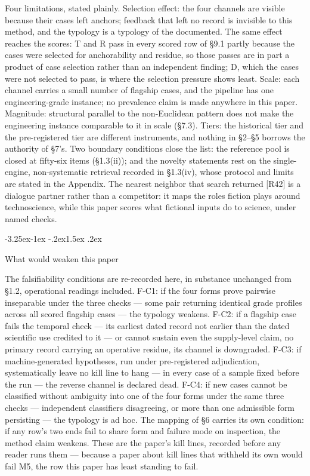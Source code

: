 \documentclass[11pt,a4paper]{article}
\makeatletter
\renewcommand\subsection{\@startsection{subsection}{2}{\z@}%
  {-3.25ex\@plus -1ex \@minus -.2ex}{1.5ex \@plus .2ex}%
  {\normalfont\large\bfseries\raggedright}}
\makeatother
\begin{document}
Four limitations, stated plainly. Selection effect: the four channels are visible because their cases left anchors; feedback that left no record is invisible to this method, and the typology is a typology of the documented. The same effect reaches the scores: T and R pass in every scored row of §9.1 partly because the cases were selected for anchorability and residue, so those passes are in part a product of case selection rather than an independent finding; D, which the cases were not selected to pass, is where the selection pressure shows least. Scale: each channel carries a small number of flagship cases, and the pipeline has one engineering-grade instance; no prevalence claim is made anywhere in this paper. Magnitude: structural parallel to the non-Euclidean pattern does not make the engineering instance comparable to it in scale (§7.3). Tiers: the historical tier and the pre-registered tier are different instruments, and nothing in §2–§5 borrows the authority of §7's. Two boundary conditions close the list: the reference pool is closed at fifty-six items (§1.3(ii)); and the novelty statements rest on the single-engine, non-systematic retrieval recorded in §1.3(iv), whose protocol and limits are stated in the Appendix. The nearest neighbor that search returned [R42] is a dialogue partner rather than a competitor: it maps the roles fiction plays around technoscience, while this paper scores what fictional inputs do to science, under named checks.

\subsection{What would weaken this paper}

The falsifiability conditions are re-recorded here, in substance unchanged from §1.2, operational readings included. F-C1: if the four forms prove pairwise inseparable under the three checks — some pair returning identical grade profiles across all scored flagship cases — the typology weakens. F-C2: if a flagship case fails the temporal check — its earliest dated record not earlier than the dated scientific use credited to it — or cannot sustain even the supply-level claim, no primary record carrying an operative residue, its channel is downgraded. F-C3: if machine-generated hypotheses, run under pre-registered adjudication, systematically leave no kill line to hang — in every case of a sample fixed before the run — the reverse channel is declared dead. F-C4: if new cases cannot be classified without ambiguity into one of the four forms under the same three checks — independent classifiers disagreeing, or more than one admissible form persisting — the typology is ad hoc. The mapping of §6 carries its own condition: if any row's two ends fail to share form and failure mode on inspection, the method claim weakens. These are the paper's kill lines, recorded before any reader runs them — because a paper about kill lines that withheld its own would fail M5, the row this paper has least standing to fail.
\end{document}
